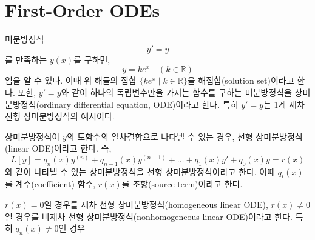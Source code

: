 \documentclass[../engineering_mathematics_lecture_note.tex]{subfiles}
\begin{document}
\section{First-Order ODEs}
미분방정식
\begin{equation*}
    y' = y
\end{equation*}
를 만족하는 $y(x)$를 구하면,
\begin{equation*}
    y = ke^x \quad (k \in \mathbb R)
\end{equation*}
임을 알 수 있다.
이때 위 해들의 집합 $\{ke^x \mid k \in \mathbb R\}$을 해집합(solution set)이라고 한다.
또한, $y' = y$와 같이 하나의 독립변수만을 가지는 함수를 구하는 미분방정식을 상미분방정식(ordinary differential equation, ODE)이라고 한다.
특히 $y' = y$는 1계 제차 선형 상미분방정식의 예시이다.

\begin{definition}
    상미분방정식이 $y$의 도함수의 일차결합으로 나타낼 수 있는 경우, 선형 상미분방정식(linear ODE)이라고 한다.
    즉,
    \begin{equation*}
        L[y] = q_n(x) y^{(n)} + q_{n - 1}(x) y^{(n - 1)} + \dots + q_1(x) y' + q_0(x) y = r(x)
    \end{equation*}
    와 같이 나타낼 수 있는 상미분방정식을 선형 상미분방정식이라고 한다.
    이때 $q_i(x)$를 계수(coefficient) 함수, $r(x)$를 초항(source term)이라고 한다.

    $r(x) = 0$일 경우를 제차 선형 상미분방정식(homogeneous linear ODE), $r(x) \neq 0$일 경우를 비제차 선형 상미분방정식(nonhomogeneous linear ODE)이라고 한다.
    특히 $q_n(x) \neq 0$인 경우 
\end{definition}
\end{document}
